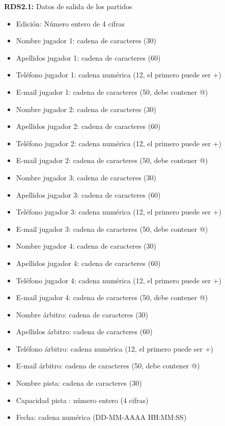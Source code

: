 \textbf{RDS2.1:} Datos de salida de los partidos
\begin{itemize}
	\item Edición: Número entero de 4 cifras
\newline
	\item Nombre jugador 1: cadena de caracteres (30)
	\item Apellidos jugador 1: cadena de caracteres (60)
	\item Teléfono jugador 1: cadena numérica (12, el primero puede ser +)
	\item E-mail jugador 1: cadena de caracteres (50, debe contener @)
\newline
	\item Nombre jugador 2: cadena de caracteres (30)
	\item Apellidos jugador 2: cadena de caracteres (60)
	\item Teléfono jugador 2: cadena numérica (12, el primero puede ser +)
	\item E-mail jugador 2: cadena de caracteres (50, debe contener @)
\newline
	\item Nombre jugador 3: cadena de caracteres (30)
	\item Apellidos jugador 3: cadena de caracteres (60)
	\item Teléfono jugador 3: cadena numérica (12, el primero puede ser +)
	\item E-mail jugador 3: cadena de caracteres (50, debe contener @)
\newline
	\item Nombre jugador 4: cadena de caracteres (30)
	\item Apellidos jugador 4: cadena de caracteres (60)
	\item Teléfono jugador 4: cadena numérica (12, el primero puede ser +)
	\item E-mail jugador 4: cadena de caracteres (50, debe contener @)
\newline
	\item Nombre árbitro: cadena de caracteres (30)
	\item Apellidos árbitro: cadena de caracteres (60)
	\item Teléfono árbitro: cadena numérica (12, el primero puede ser +)
	\item E-mail árbitro: cadena de caracteres (50, debe contener @)
\newline
	\item Nombre pista: cadena de caracteres (30)
	\item Capacidad pista : número entero (4 cifras)
	\item Fecha: cadena numérica (DD-MM-AAAA HH:MM:SS)
\end{itemize}

